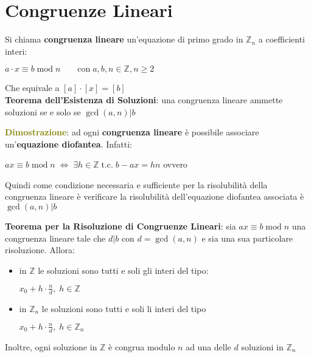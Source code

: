 \section{Congruenze Lineari}

\begin{flushleft}
    Si chiama \textbf{congruenza lineare} un'equazione di primo grado in $\mathbb{Z}_n$ a coefficienti interi:

    {\centering
        $a \cdot x \equiv b \; \text{mod} \; n \qquad \text{con} \; a, b, n \in \mathbb{Z}, n \geq 2$
    \par}
    Che equivale a $[a] \cdot [x] = [b]$ \\
    \textbf{Teorema dell'Esistenza di Soluzioni}: una congruenza lineare ammette soluzioni se e solo se $\gcd (a, n)|b$
    \begin{boxA}
        \textcolor{olive}{\textbf{Dimostrazione}}: ad ogni \textbf{congruenza lineare} è possibile associare un'\textbf{equazione diofantea}. Infatti:

        {\centering
            $ax \equiv b \; \text{mod} \; n \; \Longleftrightarrow \; \exists h \in \mathbb{Z} \; \text{t.c.} \; b - ax = hn$ ovvero 
        \par}
        Quindi come condizione necessaria e sufficiente per la risolubilità della congruenza lineare è verificare la risolubilità dell'equazione diofantea associata è $\gcd (a, n)|b$ 
    \end{boxA}

    \textbf{Teorema per la Risoluzione di Congruenze Lineari}: sia $ax \equiv b \; \text{mod} \; n$ una congruenza lineare tale che $d|b$ con $d = \gcd (a, n)$ e sia  una sua particolare risoluzione. Allora:
    \begin{itemize}[nosep]
        \item in $\mathbb{Z}$ le soluzioni sono tutti e soli gli interi del tipo:

        {\centering
            $x_0 + h \cdot \frac{n}{d}, \; h \in \mathbb{Z}$
        \par}
        \item in $\mathbb{Z}_n$ le soluzioni sono tutti e soli li interi del tipo

        {\centering
            $x_0 + h \cdot \frac{n}{d}, \; h \in \mathbb{Z}_n$
        \par}
    \end{itemize}
    Inoltre, ogni soluzione in $\mathbb{Z}$ è congrua modulo $n$ ad una delle $d$ soluzioni in $\mathbb{Z}_n$


\end{flushleft}
